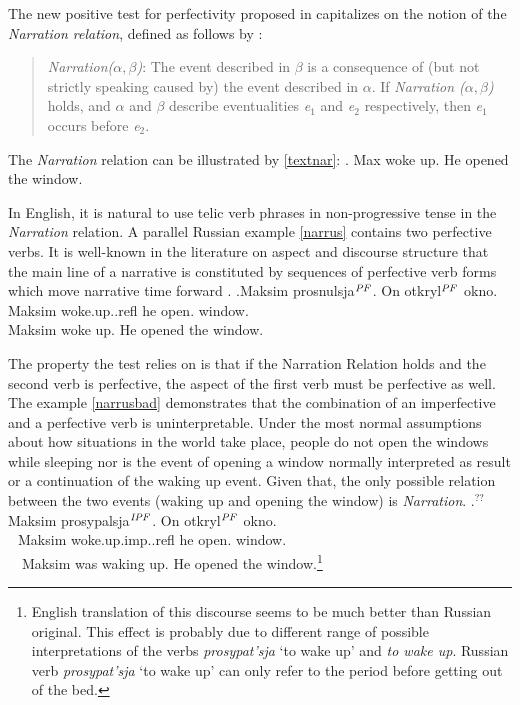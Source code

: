 The new positive test for perfectivity proposed in \citet{ZinovaFilip:13} capitalizes on the notion of the \textit{Narration relation}, defined as follows by \citet{Lascarides:93}:

\begin{quote}
\textit{Narration($\alpha,\beta$)}: The event described in $\beta$ is a consequence of (but not strictly speaking caused by) the event described in $\alpha$. If \textit{Narration ($\alpha,\beta$)} holds, and $\alpha$ and $\beta$ describe eventualities \textit{e$_1$} and \textit{e$_2$} respectively, then \textit{e$_1$} occurs before \textit{e$_2$}.
\end{quote}

The \textit{Narration} relation can be illustrated by \ref{textnar}: 
\ex.\label{textnar} Max woke up. He opened the window. 

In English, it is natural to use telic verb phrases in non-progressive tense in the \textit{Narration} relation. A parallel Russian example \ref{narrus} contains two perfective verbs. It is well-known  in the literature on aspect and discourse structure that the main line of a narrative is constituted by sequences of perfective verb forms which move narrative time forward \citep[for Russian, see in particular][]{Paducheva:96, Paducheva:04}.
\exg.\label{narrus}Maksim prosnulsja$^{\mathit{PF}}$. On otkryl$^{\mathit{PF}}$ okno.\\
Maksim woke.up..refl he open. window.\\
Maksim woke up. He opened the window.

The property the test relies on is that if the Narration Relation holds and the second verb is perfective, the aspect of the first verb must be perfective as well. The example \ref{narrusbad} demonstrates that the combination of an imperfective and a perfective verb is uninterpretable. Under the most normal assumptions about how situations in the world take place, people do not open the windows while sleeping nor is the event of opening a window normally interpreted as result or a continuation of the waking up event. Given that, the only possible relation between the two events (waking up and opening the window) is \textit{Narration}.
\exg.\label{narrusbad}$^{??}$Maksim prosypalsja$^{\mathit{IPF}}$. On otkryl$^{\mathit{PF}}$ okno.\\
\textcolor{white}{$^{??}$}Maksim woke.up.imp..refl he open. window.\\
~~Maksim was waking up. He opened the window.\footnote{English translation of this discourse seems to be much better than Russian original. This effect is probably due to different range of possible interpretations of the verbs \textit{prosypat'sja} `to wake up' and \textit{to wake up}. Russian verb \textit{prosypat'sja} `to wake up' can only refer to the period before getting out of the bed.}

